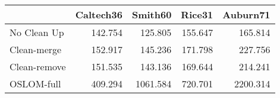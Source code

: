 \begin{tabular}{lrrrr}
\toprule
{} & Caltech36 &  Smith60 &  Rice31 & Auburn71 \\
\midrule
No Clean Up  &   142.754 &  125.805 & 155.647 &  165.814 \\
Clean-merge  &   152.917 &  145.236 & 171.798 &  227.756 \\
Clean-remove &   151.535 &  143.136 & 169.644 &  214.241 \\
OSLOM-full   &   409.294 & 1061.584 & 720.701 & 2200.314 \\
\bottomrule
\end{tabular}
